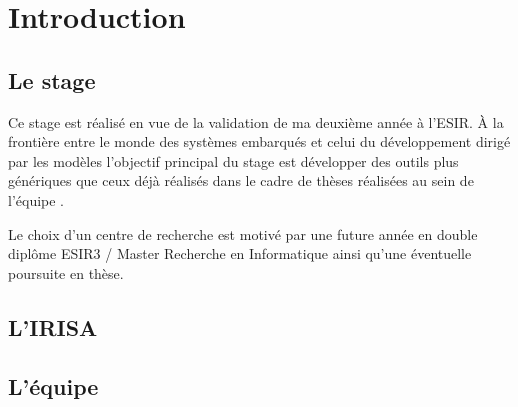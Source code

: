 \section*{Introduction} %

\subsection{Le stage}
Ce stage est réalisé en vue de la validation de ma deuxième année à l'ESIR. À la frontière entre le monde des systèmes embarqués et celui du développement dirigé par les modèles l'objectif principal du stage est développer des outils plus génériques que ceux déjà réalisés dans le cadre de thèses réalisées au sein de l'équipe \diver.

Le choix d'un centre de recherche est motivé par une future année en double diplôme ESIR3 / Master Recherche en Informatique ainsi qu'une éventuelle poursuite en thèse.

\subsection{L'IRISA}

\subsection{L'équipe \diver}

